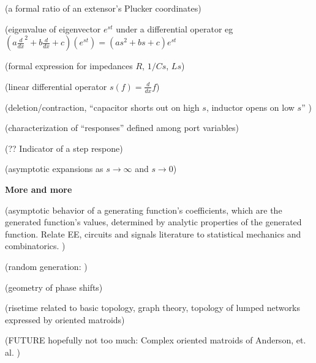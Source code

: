 \documentclass{article}
\begin{document}
(a formal ratio of an extensor's Plucker coordinates)

(eigenvalue of eigenvector $e^{s t}$ under a differential operator eg 
$(a\frac{d}{dx}^2 + b\frac{d}{dx} + c)(e^{st}) = (as^2 +bs + c)e^{st}$

(formal expression for impedances $R$, $1/Cs$, $Ls$)

(linear differential operator $s(f) = \frac{d}{dx}f$)

(deletion/contraction, 
``capacitor shorts out on high $s$, inductor opens on low $s$'' 
\cite{intuitAna})

(characterization of ``responses'' defined among port variables)

(?? Indicator of a step respone)

(asymptotic expansions as $s\rightarrow\infty$
and $s\rightarrow 0$)

\noindent\textbf{More and more}

(asymptotic behavior of a generating function's coefficients, which are
the generated function's values, determined by analytic properties of the
generated function.  Relate EE, circuits and signals literature to 
statistical mechanics and combinatorics.  
\cite{statMechForGraphers,multivarHalfPlane,AnalyticCombinatoricsBook})

(random generation: \cite{BoltzmanSampRandCombGen})

(geometry of phase shifts)

(risetime related to basic topology, graph theory, topology of lumped
networks expressed by oriented matroids)

(FUTURE hopefully not too much: Complex oriented matroids of Anderson, et.
al. \cite{complexOM})




{}

\end{document}
